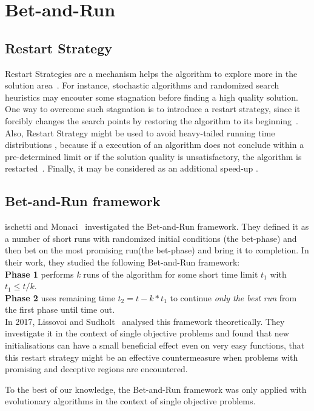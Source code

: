 \section{Bet-and-Run}\label{intro}

\subsection{Restart Strategy}
Restart Strategies are a mechanism helps the algorithm to explore more in the solution area~\cite{yu2018simulated}. For instance, stochastic algorithms and randomized search heuristics may encouter some stagnation before finding a high quality solution. One way to overcome  such stagnation is to introduce a restart strategy, since it forcibly changes the search points by restoring the algorithm to its beginning~\cite{kanahara2018restart}. Also, Restart Strategy might be used to avoid heavy-tailed running time distributions \cite{gomes2000heavy}, because if a execution of an algorithm does not conclude within a pre-determined limit or if the solution quality is unsatisfactory, the algorithm is restarted~\cite{lissovoi2017theoretical}. Finally, it may be considered as an additional speed-up \cite{friedrich2017generic}.

\subsection{Bet-and-Run framework}


ischetti and Monaci~\cite{fischetti2014exploiting} investigated the Bet-and-Run framework. They defined it as a number of short runs with randomized initial conditions (the bet-phase) and then bet on the most promising run(the bet-phase) and bring it to completion. In their work, they studied the following Bet-and-Run framework:\\


\indent \textbf{Phase 1} performs \textit{k} runs of the algorithm for some short time limit \textit{$t_1$} with $t_1 \leq t/k$.\\
\indent \textbf{Phase 2} uses remaining time $t_2 = t - k*t_1$ to continue \textit{only the best run} from the first phase until time out. \\

In 2017, Lissovoi and Sudholt~\cite{lissovoi2017theoretical} analysed this framework theoretically. They investigate it in the context of single objective problems and found that new initialisations can have a small beneficial effect even on very easy functions, that this restart strategy might be an effective countermeasure when problems with promising and deceptive regions are encountered.


To the best of our knowledge, the Bet-and-Run framework was only applied with evolutionary algorithms in the context of single objective problems. 

